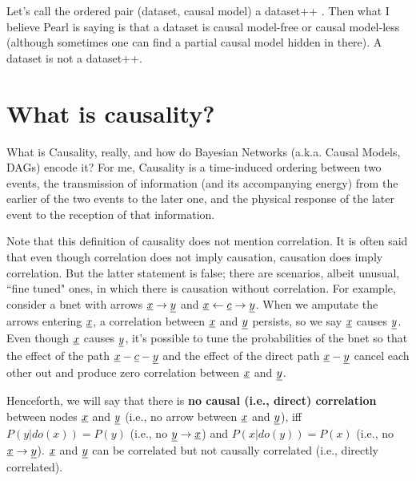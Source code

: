 Let’s call the ordered pair
(dataset, causal model) a
dataset++ . Then what I
believe Pearl is saying is that a
dataset is causal model-free or causal model-less
(although sometimes one can find a partial
causal model hidden in there). A dataset
is not a dataset++.

\section{What is causality?}
What is Causality, really, and how do Bayesian Networks
(a.k.a. Causal Models,
DAGs) encode it?
For me, Causality is a time-induced ordering between two events, the
transmission of information (and its accompanying
energy) from the earlier of the two events to the later
one, and the physical response of the later event to the reception of that
information. 

Note that this definition
of causality does not mention
correlation.
It is often said that even though
correlation does not imply causation,
causation does imply correlation.
But the latter statement is false; there
are scenarios, albeit  unusual,
``fine tuned" ones,
in which there is causation
without correlation.
For example, 
consider a bnet 
with arrows ${\underline{x}}\rightarrow {\underline{y}}$
and ${\underline{x}}\leftarrow {\underline{c}} \rightarrow {\underline{y}}$.
When we amputate 
the arrows entering ${\underline{x}}$,
a correlation
between ${\underline{x}}$ and ${\underline{y}}$ persists,
so we say ${\underline{x}}$ causes ${\underline{y}}$.
Even
though ${\underline{x}}$ causes ${\underline{y}}$,
it's possible to tune the 
probabilities
of the bnet so that
the effect of the path ${\underline{x}}-{\underline{c}}-{\underline{y}}$
and the effect of the direct path ${\underline{x}}-{\underline{y}}$
cancel 
each other out and
produce zero 
correlation between ${\underline{x}}$ and ${\underline{y}}$.

Henceforth,
we will say that there is
  {\bf no causal (i.e., direct) correlation}
between nodes ${\underline{x}}$ and
${\underline{y}}$ (i.e., no arrow between
${\underline{x}}$ and ${\underline{y}}$), iff
$P(y|do(x))=P(y)$ (i.e., no ${\underline{y}}\rightarrow {\underline{x}}$)
and
$P(x|do(y))=P(x)$ (i.e., no
${\underline{x}}\rightarrow {\underline{y}}$).
${\underline{x}}$ and ${\underline{y}}$ can
be correlated but
not causally  correlated
(i.e., directly correlated).


